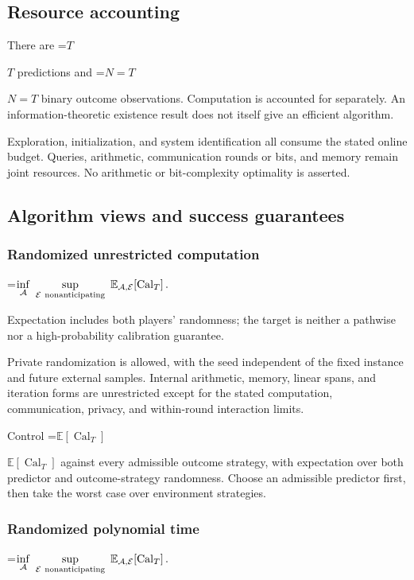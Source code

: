 \documentclass[10pt,a4paper]{article}
\newcommand{\AtlasMath}[1]{\par\begingroup\centering\setbox0=\hbox{$\displaystyle #1$}\ifdim\wd0>1.4\linewidth\typeout{ATLAS WIDE FORMULA: \the\wd0}\fi\ifdim\wd0>\linewidth\resizebox{\linewidth}{!}{\box0}\else\box0\fi\par\endgroup}
\newcommand{\AtlasInlineMath}[1]{\begingroup\setbox0=\hbox{$#1$}\ifdim\wd0>.4\linewidth\endgroup\AtlasMath{#1}\else\endgroup$#1$\fi}
\begin{document}
\subsection{Resource accounting}
There are \AtlasInlineMath{T} predictions and \AtlasInlineMath{N=T} binary outcome observations. Computation is accounted for separately. An information-theoretic existence result does not itself give an efficient algorithm.

Exploration, initialization, and system identification all consume the stated online budget. Queries, arithmetic, communication rounds or bits, and memory remain joint resources. No arithmetic or bit-complexity optimality is asserted.

\subsection{Algorithm views and success guarantees}
\subsubsection{Randomized unrestricted computation}

\AtlasMath{\inf_{\mathcal{A}}\ \sup_{\mathcal{E}\ \text{\text{nonanticipating}}}\ \mathbb{E}_{\mathcal{A},\mathcal{E}}\!\left[\operatorname{Cal}_T\right].}


Expectation includes both players' randomness; the target is neither a pathwise nor a high-probability calibration guarantee.

Private randomization is allowed, with the seed independent of the fixed instance and future external samples. Internal arithmetic, memory, linear spans, and iteration forms are unrestricted except for the stated computation, communication, privacy, and within-round interaction limits.

Control \AtlasInlineMath{\mathbb{E}[\operatorname{Cal}_T]} against every admissible outcome strategy, with expectation over both predictor and outcome-strategy randomness. Choose an admissible predictor first, then take the worst case over environment strategies.

\subsubsection{Randomized polynomial time}

\AtlasMath{\inf_{\mathcal{A}}\ \sup_{\mathcal{E}\ \text{\text{nonanticipating}}}\ \mathbb{E}_{\mathcal{A},\mathcal{E}}\!\left[\operatorname{Cal}_T\right].}
\end{document}
